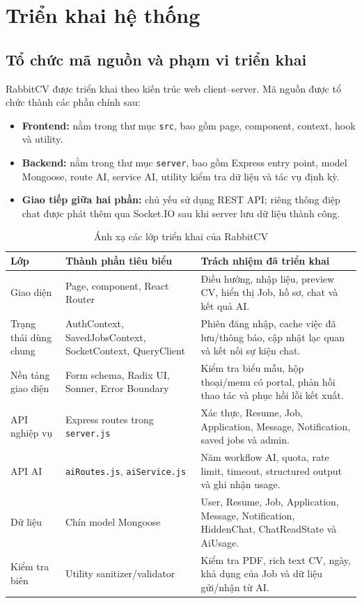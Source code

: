 \chapter{Triển khai hệ thống}

\section{Tổ chức mã nguồn và phạm vi triển khai}

RabbitCV được triển khai theo kiến trúc web client--server. Mã nguồn được tổ chức thành các phần chính sau:

\begin{itemize}
    \item \textbf{Frontend:} nằm trong thư mục \texttt{src}, bao gồm page, component, context, hook và utility.
    \item \textbf{Backend:} nằm trong thư mục \texttt{server}, bao gồm Express entry point, model Mongoose, route AI, service AI, utility kiểm tra dữ liệu và tác vụ định kỳ.
    \item \textbf{Giao tiếp giữa hai phần:} chủ yếu sử dụng REST API; riêng thông điệp chat được phát thêm qua Socket.IO sau khi server lưu dữ liệu thành công.
\end{itemize}

\begin{table}[H]
    \centering
    \small
    \begin{tabularx}{\textwidth}{|p{}|p{}|Y|} \hline
        \textbf{Lớp} & \textbf{Thành phần tiêu biểu} & \textbf{Trách nhiệm đã triển khai} \\ \hline
        Giao diện & Page, component, React Router & Điều hướng, nhập liệu, preview CV, hiển thị Job, hồ sơ, chat và kết quả AI. \\ \hline
        Trạng thái dùng chung & AuthContext, SavedJobsContext, SocketContext, QueryClient & Phiên đăng nhập, cache việc đã lưu/thông báo, cập nhật lạc quan và kết nối sự kiện chat. \\ \hline
        Nền tảng giao diện & Form schema, Radix UI, Sonner, Error Boundary & Kiểm tra biểu mẫu, hộp thoại/menu có portal, phản hồi thao tác và phục hồi lỗi kết xuất. \\ \hline
        API nghiệp vụ & Express routes trong \texttt{server.js} & Xác thực, Resume, Job, Application, Message, Notification, saved jobs và admin. \\ \hline
        API AI & \texttt{aiRoutes.js}, \texttt{aiService.js} & Năm workflow AI, quota, rate limit, timeout, structured output và ghi nhận usage. \\ \hline
        Dữ liệu & Chín model Mongoose & User, Resume, Job, Application, Message, Notification, HiddenChat, ChatReadState và AiUsage. \\ \hline
        Kiểm tra biên & Utility sanitizer/validator & Kiểm tra PDF, rich text CV, ngày, khả dụng của Job và dữ liệu gửi/nhận từ AI. \\ \hline
    \end{tabularx}
    \caption{Ánh xạ các lớp triển khai của RabbitCV}
    \label{tab:implementation-layers}
\end{table}

